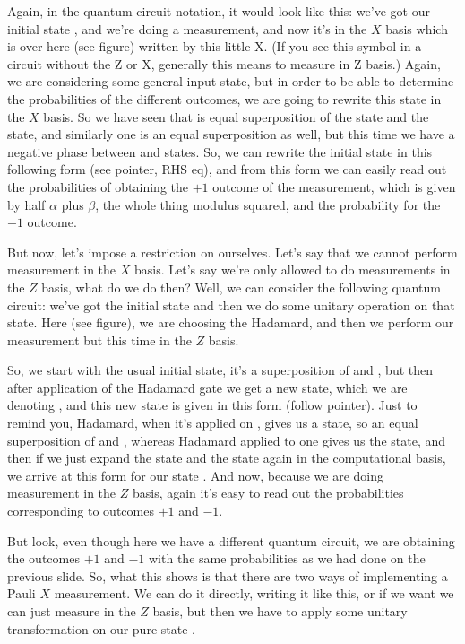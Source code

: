 Again, in the quantum circuit notation, it would look like this: we've got our initial state \ket{\psi}, and we're doing a measurement, and now it's in the $X$ basis which is over here (see figure) written by this little X.  (If you see this symbol in a circuit without the Z or X, generally this means to measure in Z basis.) Again, we are considering some general input state, but in order to be able to determine the probabilities of the different outcomes, we are going to rewrite this state in the $X$ basis. So we have seen that  is equal superposition of the \ket{+} state and the \ket{-} state, and similarly one is an equal superposition as well, but this time we have a negative phase between \ket{+} and \ket{-} states. So, we can rewrite the initial state in this following form (see pointer, RHS eq), and from this form we can easily read out the probabilities of obtaining the  $+1$ outcome of the measurement, which is given by half $\alpha$ plus $\beta$, the whole thing modulus squared, and the probability for the  $-1$ outcome.

But now, let's impose a restriction on ourselves. Let's say that we cannot perform measurement in the $X$ basis. Let's say we're only allowed to do measurements in the $Z$ basis, what do we do then? Well, we can consider the following quantum circuit: we've got the initial state and then we do some unitary operation on that state. Here (see figure), we are choosing the Hadamard, and then we perform our measurement but this time in the $Z$ basis.

So, we start with the usual initial state, it's a superposition of  and , but then after application of the Hadamard gate we get a new state, which we are denoting , and this new state is given in this form (follow pointer). Just to remind you, Hadamard, when it's applied on , gives us a \ket{+} state, so an equal superposition of  and , whereas Hadamard applied to one gives us the \ket{-} state, and then if we just expand the \ket{+} state and the \ket{-} state again in the computational basis, we arrive at this form for our state \ket{\Psi^+}. And now, because we are doing measurement in the $Z$ basis, again it's easy to read out the probabilities corresponding to outcomes $+1$ and $-1$.

But look, even though here we have a different quantum circuit, we are obtaining the outcomes $+1$ and $-1$ with the same probabilities as we had done on the previous slide. So, what this shows is that there are two ways of implementing a Pauli $X$ measurement. We can do it directly, writing it like this, or if we want we can just measure in the $Z$ basis, but then we have to apply some unitary transformation on our pure state \ket{\psi}.

